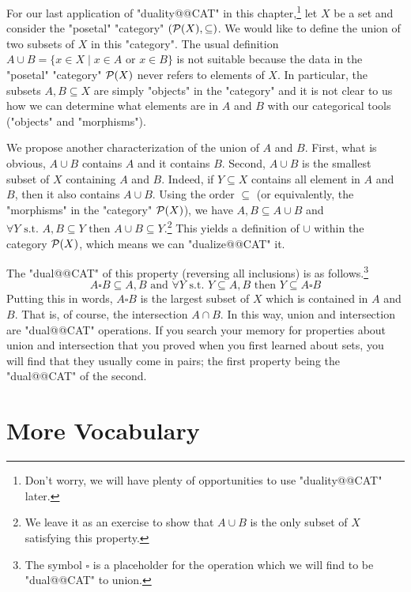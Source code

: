 \documentclass[main.tex]{subfiles}
\begin{document}
\begin{exmp}
For our last application of "duality@@CAT" in this chapter,\footnote{Don't worry, we will have plenty of opportunities to use "duality@@CAT" later.} let $X$ be a set and consider the "posetal" "category" $(\mathcal{P}(X), \subseteq)$. We would like to define the union of two subsets of $X$ in this "category". The usual definition $A \cup B = \{x \in X \mid x \in A \text{ or } x \in B\}$ is not suitable because the data in the "posetal" "category" $\mathcal{P}(X)$ never refers to elements of $X$. In particular, the subsets $A,B \subseteq X$ are simply "objects" in the "category" and it is not clear to us how we can determine what elements are in $A$ and $B$ with our categorical tools ("objects" and "morphisms").

We propose another characterization of the union of $A$ and $B$. First, what is obvious, $A \cup B$ contains $A$ and it contains $B$. Second, $A \cup B$ is the smallest subset of $X$ containing $A$ and $B$. Indeed, if $Y \subseteq X$ contains all element in $A$ and $B$, then it also contains $A \cup B$. Using the order $\subseteq$ (or equivalently, the "morphisms" in the "category" $\mathcal{P}(X)$), we have $A, B \subseteq A\cup B$ and $\forall Y \text{ s.t. } A, B \subseteq Y \text{ then } A\cup B \subseteq Y$.\footnote{We leave it as an exercise to show that $A \cup B$ is the only subset of $X$ satisfying this property.} This yields a definition of $\cup$ within the category $\mathcal{P}(X)$, which means we can "dualize@@CAT" it.

The "dual@@CAT" of this property (reversing all inclusions) is as follows.\footnote{The symbol $\square$ is a placeholder for the operation which we will find to be "dual@@CAT" to union.}
\[ A \square B \subseteq A, B \text{ and } \forall Y \text{ s.t. } Y \subseteq A,B \text{ then } Y \subseteq A \square B\]
Putting this in words, $A \square B$ is the largest subset of $X$ which is contained in $A$ and $B$. That is, of course, the intersection $A \cap B$. In this way, union and intersection are "dual@@CAT" operations. If you search your memory for properties about union and intersection that you proved when you first learned about sets, you will find that they usually come in pairs; the first property being the "dual@@CAT" of the second. %
\end{exmp}

\section{More Vocabulary}%
\end{document}
